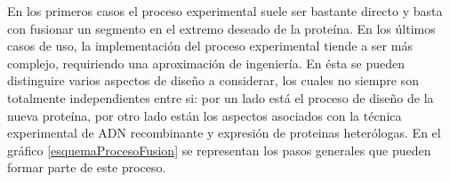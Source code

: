 % 

En los primeros casos el proceso experimental suele ser bastante directo y basta con fusionar un segmento en el extremo deseado de la proteína. 
En los últimos casos de uso, la implementación del proceso experimental tiende a ser más complejo, requiriendo una aproximación de ingeniería. 
En ésta se pueden distinguire varios aspectos de diseño a considerar, los cuales no siempre son totalmente independientes entre si:
por un lado está el proceso de diseño de la nueva proteína, por otro lado están los aspectos asociados con la técnica experimental de ADN recombinante y expresión de proteinas heterólogas. 
En el gráfico \ref{esquemaProcesoFusion} se representan los pasos generales que pueden formar parte de este proceso.

